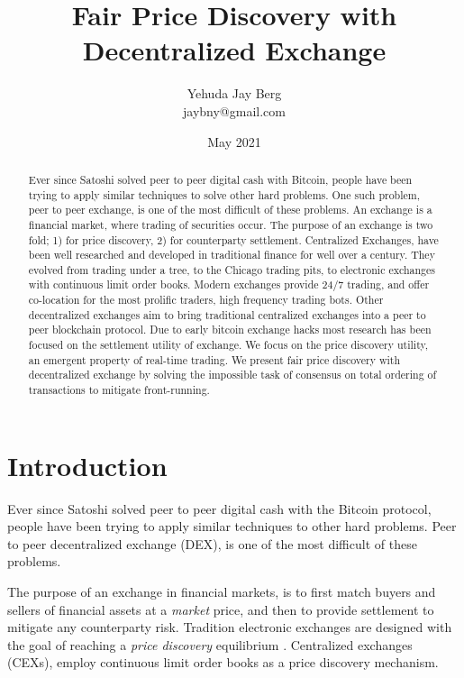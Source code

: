 \documentclass[12pt]{article}
\title{Fair Price Discovery with Decentralized Exchange}
\author{Yehuda Jay Berg \\jaybny@gmail.com}
\date{May 2021}
\begin{document}
\parindent 0cm
\parskip   6pt
\maketitle




\begin{abstract}
Ever  since  Satoshi  solved  peer  to  peer  digital  cash  with  Bitcoin,  people have  been  trying  to  apply  similar  techniques  to  solve  other  hard  problems. One such problem, peer to peer exchange, is one of the most difficult of these problems. An exchange is a financial market, where trading of securities occur. The purpose of an exchange is two fold;  1) for price discovery, 2) for counterparty settlement. Centralized Exchanges, have been well researched and developed in traditional finance for well over a century.  They evolved from trading under a tree, to the Chicago trading pits, to electronic exchanges with continuous limit order books. Modern exchanges provide 24/7 trading, and offer co-location for the most prolific traders, high frequency trading bots. Other decentralized exchanges aim to bring traditional centralized exchanges into a peer to peer blockchain protocol. Due to early bitcoin exchange hacks most research has been focused on the settlement utility of exchange. We focus on the price discovery utility, an emergent property of real-time trading. We present fair price discovery with decentralized exchange by solving the impossible task of consensus on total ordering of transactions to mitigate front-running.
\end{abstract}

\section{Introduction}
Ever since Satoshi solved peer to peer digital cash with the Bitcoin protocol, people have been trying to apply similar techniques to other hard problems. Peer to peer decentralized exchange (DEX), is one of the most difficult of these problems. 

The purpose of an exchange in financial markets, is to first match buyers and sellers of financial assets at a \emph{market} price, and then to provide settlement to mitigate any counterparty risk. Tradition electronic exchanges are designed with the goal of reaching a  \emph{price discovery} equilibrium \cite{francioni_schwartz_2017}. Centralized exchanges (CEXs), employ continuous limit order books as a price discovery mechanism. 
\end{document}
